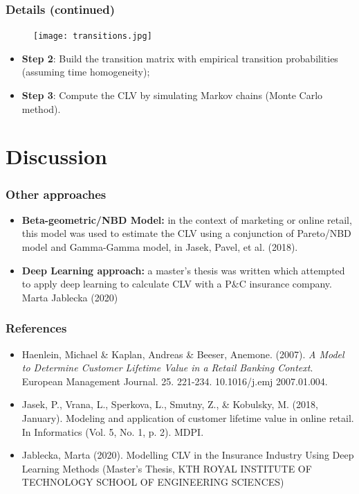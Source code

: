 \documentclass[aspectratio=169,xcolor=x11names,compress]{beamer}
\begin{document}
\begin{frame}
\frametitle{Details (continued)}

\begin{figure}
	\texttt{[image: transitions.jpg]}
\end{figure}
	
\begin{itemize}
	\item \textbf{Step 2}: Build the transition matrix with empirical transition probabilities (assuming time homogeneity);
	\item \textbf{Step 3}: Compute the CLV by simulating Markov chains (Monte Carlo method).
\end{itemize}
\end{frame}

\section{Discussion}

\begin{frame}
\frametitle{Other approaches}

\begin{itemize}
\item \textbf{Beta-geometric/NBD Model:} in the context of marketing or online retail, this model was used to estimate the CLV using a conjunction of Pareto/NBD model and Gamma-Gamma model, in Jasek, Pavel, et al. (2018).
\item \textbf{Deep Learning approach:} a master's thesis was written which attempted to apply deep learning to calculate CLV with a P$\&$C insurance company. Marta Jablecka (2020)
\end{itemize}

\end{frame}

\begin{frame}
\frametitle{References}

\begin{itemize}
	\item Haenlein, Michael \& Kaplan, Andreas \& Beeser, Anemone. (2007). \textit{A Model to Determine Customer Lifetime Value in a Retail Banking Context}. European Management Journal. 25. 221-234. 10.1016/j.emj 2007.01.004. 
 	\item Jasek, P., Vrana, L., Sperkova, L., Smutny, Z., & Kobulsky, M. (2018, January). Modeling and application of customer lifetime value in online retail. In Informatics (Vol. 5, No. 1, p. 2). MDPI.
  	\item Jablecka, Marta (2020). Modelling CLV in the Insurance Industry Using Deep Learning Methods (Master's Thesis, KTH ROYAL INSTITUTE OF TECHNOLOGY
SCHOOL OF ENGINEERING SCIENCES)
\end{itemize}

\end{frame}
\end{document}
